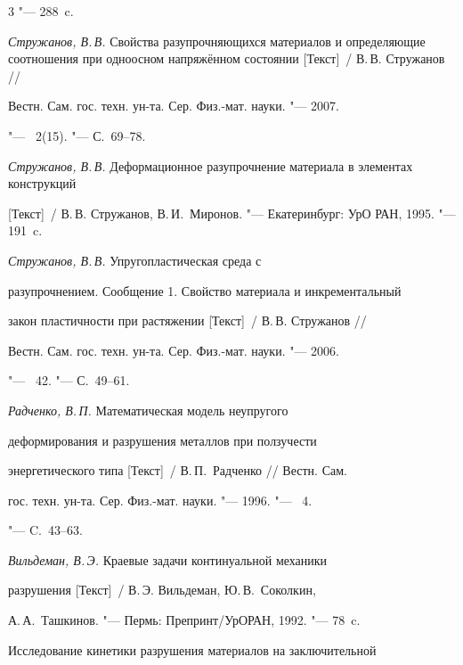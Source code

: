 \begin{thebibliography}{3}
"--- 288~c.




\emph{Стружанов, В.\,В.} Свойства разупрочняющихся материалов и определяющие соотношения при одноосном напряжённом состоянии [Текст]~/ В.\,В. Стружанов /\!/

Вестн. Сам. гос. техн. ун-та. Сер. Физ.-мат. науки. "--- 2007.

"--- \No~2(15). "--- С.~69--78.






\emph{Стружанов, В.\,В.} Деформационное разупрочнение материала в элементах конструкций 

[Текст]~/ В.\,В. Стружанов, В.\,И.~Миронов. "--- Екатеринбург: УрО РАН, 1995. "--- 191~c. 




\emph{Стружанов, В.\,В.} Упругопластическая среда с

разупрочнением. Сообщение 1. Свойство материала и инкрементальный

закон пластичности при растяжении [Текст]~/ В.\,В. Стружанов /\!/

Вестн. Сам. гос. техн. ун-та. Сер. Физ.-мат. науки. "--- 2006.

"--- \No~42. "--- С.~49--61.




\emph{Радченко, В.\,П.} Математическая модель неупругого

деформирования и разрушения металлов при ползучести

энергетического типа [Текст]~/ В.\,П.~Радченко /\!/ Вестн. Сам.

гос. техн. ун-та. Сер. Физ.-мат. науки. "--- 1996. "--- \No~4.

"--- C.~43--63.




\emph{Вильдеман, В.\,Э.} Краевые задачи континуальной механики

разрушения [Текст]~/ В.\,Э. Вильдеман, Ю.\,В.~Соколкин,

А.\,А.~Ташкинов. "--- Пермь: Препринт/УрОРАН, 1992. "--- 78~c.




Исследование кинетики разрушения материалов на заключительной


\end{thebibliography}
